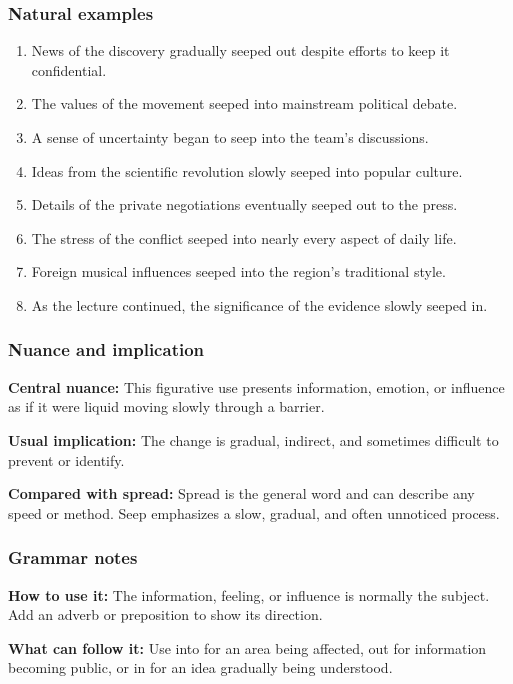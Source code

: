 \documentclass[11pt]{article}
\begin{document}
\subsubsection{Natural examples}
\begin{enumerate}
  \item News of the discovery gradually seeped out despite efforts to keep it confidential.
  \item The values of the movement seeped into mainstream political debate.
  \item A sense of uncertainty began to seep into the team's discussions.
  \item Ideas from the scientific revolution slowly seeped into popular culture.
  \item Details of the private negotiations eventually seeped out to the press.
  \item The stress of the conflict seeped into nearly every aspect of daily life.
  \item Foreign musical influences seeped into the region's traditional style.
  \item As the lecture continued, the significance of the evidence slowly seeped in.
\end{enumerate}

\subsubsection{Nuance and implication}
\textbf{Central nuance:} This figurative use presents information, emotion, or influence as if it were liquid moving slowly through a barrier.

\textbf{Usual implication:} The change is gradual, indirect, and sometimes difficult to prevent or identify.

\textbf{Compared with spread:} Spread is the general word and can describe any speed or method. Seep emphasizes a slow, gradual, and often unnoticed process.

\subsubsection{Grammar notes}
\textbf{How to use it:} The information, feeling, or influence is normally the subject. Add an adverb or preposition to show its direction.

\textbf{What can follow it:} Use into for an area being affected, out for information becoming public, or in for an idea gradually being understood.
\end{document}
